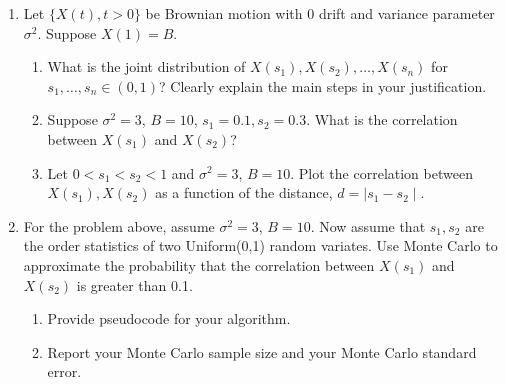 \documentclass{article}
\begin{document}
\begin{enumerate}
\item Let $\{X(t), t>0\}$ be Brownian motion with 0 drift and variance parameter $\sigma^2$. Suppose $X(1)=B$. 
\begin{enumerate}
\item What is the joint distribution of $X(s_1), X(s_2),\dots,X(s_n)$ for $s_1,\dots, s_n \in (0,1)$? Clearly explain the main steps in your justification.
\item Suppose $\sigma^2=3$, $B=10$, $s_1=0.1, s_2=0.3$. What is the correlation between $X(s_1)$ and $X(s_2)$? 
\item Let $0<s_1<s_2<1$ and $\sigma^2=3$, $B=10$. Plot the correlation between $X(s_1), X(s_2)$ as a function of the distance, $d=\mid s_1-s_2\mid$.
\end{enumerate}
\item For the problem above, assume $\sigma^2=3$, $B=10$. Now assume
  that $s_1,s_2$ are the order statistics of two Uniform(0,1) random
  variates. Use Monte Carlo to approximate the probability that the
  correlation between $X(s_1)$ and $X(s_2)$ is greater than
  0.1. 

\begin{enumerate}
\item Provide pseudocode for your algorithm. 
\item Report your Monte Carlo sample size and your Monte Carlo standard error.
\end{enumerate}

\end{enumerate}
\end{document}
